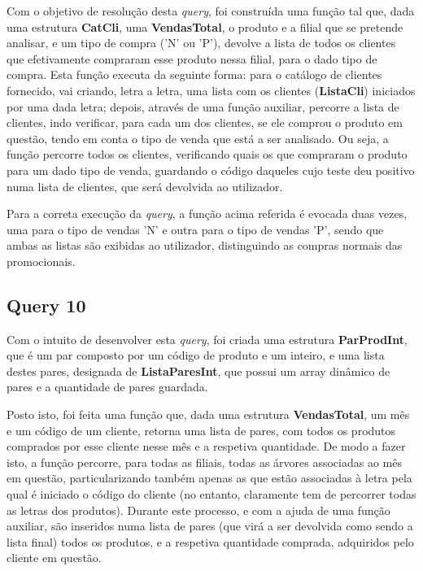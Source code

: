 \documentclass{article}
\begin{document}
\vspace{1 cm}

\par\noindent\hspace{0.52cm}Com o objetivo de resolução desta \textit{query}, foi construída uma função tal que, dada uma estrutura \textbf{CatCli}, uma \textbf{VendasTotal}, o produto e a filial que se pretende analisar, e um tipo de compra ('N' ou 'P'), devolve a lista de todos os clientes que efetivamente compraram esse produto nessa filial, para o dado tipo de compra. Esta função executa da seguinte forma: para o catálogo de clientes fornecido, vai criando, letra a letra, uma lista com os clientes (\textbf{ListaCli}) iniciados por uma dada letra; depois, através de uma função auxiliar, percorre a lista de clientes, indo verificar, para cada um dos clientes, se ele comprou o produto em questão, tendo em conta o tipo de venda que está a ser analisado. Ou seja, a função percorre todos os clientes, verificando quais os que compraram o produto para um dado tipo de venda, guardando o código daqueles cujo teste deu positivo numa lista de clientes, que será devolvida ao utilizador. 
\par Para a correta execução da \textit{query}, a função acima referida é evocada duas vezes, uma para o tipo de vendas 'N' e outra para o tipo de vendas 'P', sendo que ambas as listas são exibidas ao utilizador, distinguindo as compras normais das promocionais.

\subsection{Query 10}


\vspace{1 cm}

\par\noindent\hspace{0.52cm}Com o intuito de desenvolver esta \textit{query}, foi criada uma estrutura \textbf{ParProdInt}, que é um par composto por um código de produto e um inteiro, e uma lista destes pares, designada de \textbf{ListaParesInt}, que possui um array dinâmico de pares e a quantidade de pares guardada.
\par Posto isto, foi feita uma função que, dada uma estrutura \textbf{VendasTotal}, um mês e um código de um cliente, retorna uma lista de pares, com todos os produtos comprados por esse cliente nesse mês e a respetiva quantidade. De modo a fazer isto, a função percorre, para todas as filiais, todas as árvores associadas ao mês em questão, particularizando também apenas as que estão associadas à letra pela qual é iniciado o código do cliente (no entanto, claramente tem de percorrer todas as letras dos produtos). Durante este processo, e com a ajuda de uma função auxiliar, são inseridos numa lista de pares (que virá a ser devolvida como sendo a lista final) todos os produtos, e a respetiva quantidade comprada, adquiridos pelo cliente em questão.
\end{document}
